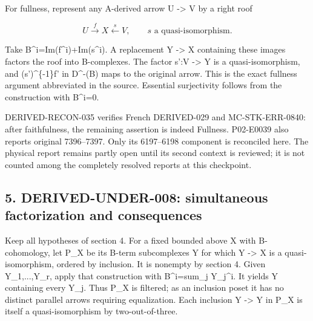 For fullness,\allowbreak{} represent any A-derived arrow U \allowbreak{}-> V by a right roof

\[
 U\xrightarrow{f}X\xleftarrow{s}V,\qquad s\text{ a quasi-isomorphism}.
                                                               \tag{4.4}
\]

Take B\textasciicircum{}i\allowbreak{}=Im(f\textasciicircum{}i)\allowbreak{}\allowbreak{}+Im(s\textasciicircum{}i)\allowbreak{}. A replacement Y \allowbreak{}-> X containing these images factors the roof into B-complexes. The factor s':\allowbreak{}V \allowbreak{}-> Y is a quasi-isomorphism,\allowbreak{} and (s')\allowbreak{}\textasciicircum{}\{-1\}f' in D\textasciicircum{}-(B)\allowbreak{} maps to the original arrow. This is the exact fullness argument abbreviated in the source. Essential surjectivity follows from the construction with B\textasciicircum{}i\allowbreak{}=0.

DERIVED-RECON-035 verifies French DERIVED-029 and MC-STK-ERR-0840:\allowbreak{} after faithfulness,\allowbreak{} the remaining assertion is indeed Fullness. P02-E0039 also reports original 7396–\allowbreak{}7397. Only its 6197–\allowbreak{}6198 component is reconciled here. The physical report remains partly open until its second context is reviewed; it is not counted among the completely resolved reports at this checkpoint.

\subsection{\texorpdfstring{5. DERIVED-UNDER-008:\allowbreak{} simultaneous factorization and consequences}{5.  simultaneous factorization and consequences}}\label{proofs-5910-6199-derived-under-008-simultaneous-factorization-and-consequences}

Keep all hypotheses of section 4. For a fixed bounded above X with B-cohomology,\allowbreak{} let P\_\allowbreak{}X be its B-term subcomplexes Y for which Y \allowbreak{}-> X is a quasi-isomorphism,\allowbreak{} ordered by inclusion. It is nonempty by section 4. Given Y\_\allowbreak{}1,\allowbreak{}...,\allowbreak{}Y\_\allowbreak{}r,\allowbreak{} apply that construction with B\textasciicircum{}i\allowbreak{}=sum\_\allowbreak{}j Y\_\allowbreak{}j\textasciicircum{}i. It yields Y containing every Y\_\allowbreak{}j. Thus P\_\allowbreak{}X is filtered; as an inclusion poset it has no distinct parallel arrows requiring equalization. Each inclusion Y \allowbreak{}-> Y\textquotesingle{} in P\_\allowbreak{}X is itself a quasi-isomorphism by two-out-of-three.

